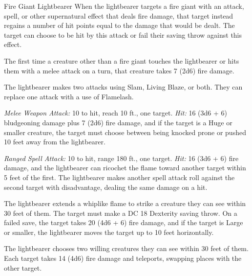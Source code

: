 \documentclass[10pt,a4paper,twoside,bg=print,twocolumn,openany,nodeprecatedcode]{dndbook}
\begin{document}
\begin{DndMonster}[float=t]{Fire Giant Lightbearer}
\DndMonsterBasics[
armor-class = {18 (natural armor)},
hit-points = {\DndDice{11d12 + 66}},
speed = {40 ft.}
]
\DndMonsterAbilityScores[
 str = 22,
 dex = 16,
 con = 23,
 int = 10,
 wis = 21,
 cha = 13
]
\DndMonsterDetails[
saving-throws = {Str +10, Dex +7, Con +10},
skills = {Athletics +10, Perception +9},
damage-immunities = {fire},
languages = {Giant},
challenge = 10,
]
When the lightbearer targets a fire giant with an attack, spell, or other supernatural effect that deals fire damage, that target instead regains a number of hit points equal to the damage that would be dealt. The target can choose to be hit by this attack or fail their saving throw against this effect.

The first time a creature other than a fire giant touches the lightbearer or hits them with a melee attack on a turn, that creature takes 7 (2d6) fire damage.

The lightbearer makes two attacks using Slam, Living Blaze, or both. They can replace one attack with a use of Flamelash.

\textsl{Melee Weapon Attack:} 10 to hit, reach 10 ft., one target. \textsl{Hit:} 16 (3d6 + 6) bludgeoning damage plus 7 (2d6) fire damage, and if the target is a Huge or smaller creature, the target must choose between being knocked prone or pushed 10 feet away from the lightbearer.

\textsl{Ranged Spell Attack:} 10 to hit, range 180 ft., one target. \textsl{Hit:} 16 (3d6 + 6) fire damage, and the lightbearer can ricochet the flame toward another target within 5 feet of the first. The lightbearer makes another spell attack roll against the second target with disadvantage, dealing the same damage on a hit.

The lightbearer extends a whiplike flame to strike a creature they can see within 30 feet of them. The target must make a DC 18 Dexterity saving throw. On a failed save, the target takes 20 (4d6 + 6) fire damage, and if the target is Large or smaller, the lightbearer moves the target up to 10 feet horizontally.

The lightbearer chooses two willing creatures they can see within 30 feet of them. Each target takes 14 (4d6) fire damage and teleports, swapping places with the other target.

\end{DndMonster}
\end{document}
